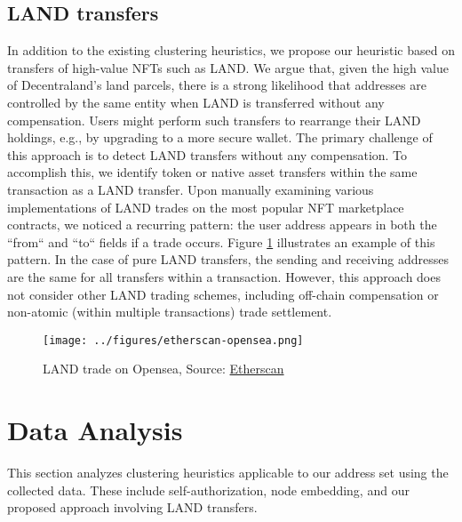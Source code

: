 \documentclass[12pt,a4paper,titlepage,oneside,english]{article}
\begin{document}
\subsection{LAND transfers}
In addition to the existing clustering heuristics, we propose our heuristic based on transfers of high-value NFTs such as LAND. We argue that, given the high value of Decentraland's land parcels, there is a strong likelihood that addresses are controlled by the same entity when LAND is transferred without any compensation. Users might perform such transfers to rearrange their LAND holdings, e.g., by upgrading to a more secure wallet. \newline
The primary challenge of this approach is to detect LAND transfers without any compensation. To accomplish this, we identify token or native asset transfers within the same transaction as a LAND transfer. Upon manually examining various implementations of LAND trades on the most popular NFT marketplace contracts, we noticed a recurring pattern: the user address appears in both the ``from`` and ``to`` fields if a trade occurs. Figure \ref{fig:LAND_example} illustrates an example of this pattern. 
In the case of pure LAND transfers, the sending and receiving addresses are the same for all transfers within a transaction. However, this approach does not consider other LAND trading schemes, including off-chain compensation or non-atomic (within multiple transactions) trade settlement.

\begin{figure}[h!]
	\centering
	\texttt{[image: ../figures/etherscan-opensea.png]}
	\caption{LAND trade on Opensea, Source: \href{https://etherscan.io/tx/0x2c2a70114e9080596bf5da6ad9c9b9f6d7e4c85a9d3b06e992f7248f9457a2ec}{Etherscan}}
	\label{fig:LAND_example}
\end{figure}


\section{Data Analysis}
This section analyzes clustering heuristics applicable to our address set using the collected data. These include self-authorization, node embedding, and our proposed approach involving LAND transfers.
\end{document}
